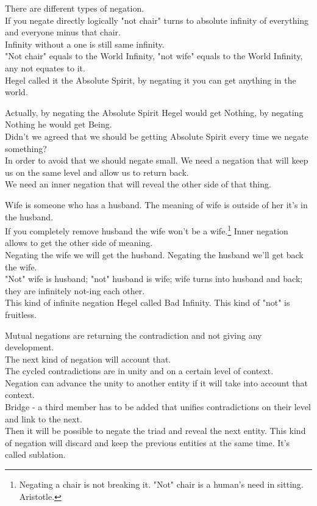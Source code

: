 \documentclass[12pt, a4paper, twocolumn]{article}
\begin{document}
\begin{appendices}
There are different types of negation.
\\ If you negate directly logically "not chair" turns to absolute infinity of everything and everyone minus that chair.
\\ Infinity without a one is still same infinity.
\\ "Not chair" equals to the World Infinity, "not wife" equals to the World Infinity, any not equates to it.
\\ Hegel called it the Absolute Spirit, by negating it you can get anything in the world.

Actually, by negating the Absolute Spirit Hegel would get Nothing, by negating Nothing he would get Being. 
\\ Didn't we agreed that we should be getting Absolute Spirit every time we negate something?
\\ In order to avoid that we should negate small. We need a negation that will keep us on the same level and allow us to return back.
\\ We need an inner negation that will reveal the other side of that thing.

Wife is someone who has a husband. The meaning of wife is outside of her it's in the husband.
\\ If you completely remove husband the wife won't be a wife.\footnote{Negating a chair is not breaking it. "Not" chair is a human's need in sitting. Aristotle.} Inner negation allows to get the other side of meaning. 
\\ Negating the wife we will get the husband. Negating the husband we'll get back the wife.
\\ "Not" wife is husband; "not" husband is wife; wife turns into husband and back; they are infinitely not-ing each other.
\\ This kind of infinite negation Hegel called Bad Infinity. This kind of "not" is fruitless.

Mutual negations are returning the contradiction and not giving any development.
\\ The next kind of negation will account that.
\\ The cycled contradictions are in unity and on a certain level of context.
\\ Negation can advance the unity to another entity if it will take into account that context.
\\ Bridge - a third member has to be added that unifies contradictions on their level and link to the next.
\\ Then it will be possible to negate the triad and reveal the next entity. This kind of negation will discard and keep the previous entities at the same time. It's called sublation.


\end{appendices}
\end{document}
